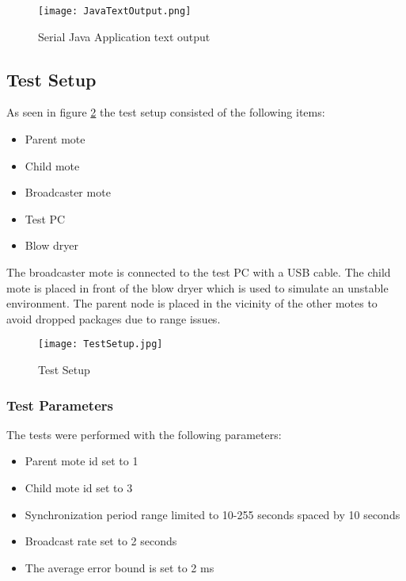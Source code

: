 \documentclass[Main]{subfiles}
\begin{document}
			\begin{figure}[H]
				\centering
				\texttt{[image: JavaTextOutput.png]}
				\caption{Serial Java Application text output}
				\label{fig:JavaTextOutput}
			\end{figure}

			


	\subsection{Test Setup} %
	\label{sub:test_setup}

		As seen in figure \ref{fig:TestSetup} the test setup consisted of the following items:

		\begin{itemize}
			\item Parent mote
			\item Child mote
			\item Broadcaster mote
			\item Test PC
			\item Blow dryer 
		\end{itemize}

		The broadcaster mote is connected to the test PC with a USB cable.
		The child mote is placed in front of the blow dryer which is used to simulate an unstable environment.
		The parent node is placed in the vicinity of the other motes to avoid dropped packages due to range issues.

		\begin{figure}[H]
			\centering
			\texttt{[image: TestSetup.jpg]}
			\caption{Test Setup}
			\label{fig:TestSetup}
		\end{figure}

		\subsubsection{Test Parameters} %
		\label{subsub:test_parameters}
			The tests were performed with the following parameters:

			\begin{itemize}
				\item Parent mote id set to 1
				\item Child mote id set to 3
				\item Synchronization period range limited to 10-255 seconds spaced by 10 seconds
				\item Broadcast rate set to 2 seconds
				\item The average error bound is set to 2 ms
			\end{itemize}
\end{document}
